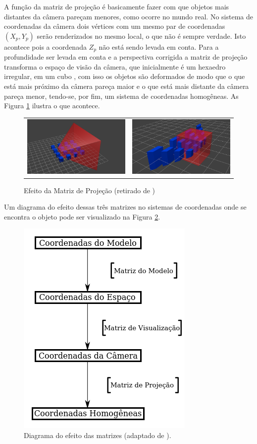 {A função da matriz de projeção é basicamente fazer com que objetos mais distantes da câmera pareçam menores, como ocorre no mundo real. No sistema de coordenadas da câmera dois vértices com um mesmo par de coordenadas $(X_p,Y_p)$ serão renderizados no mesmo local, o que não é sempre verdade. Isto acontece pois a coordenada $Z_p$ não está sendo levada em conta. Para a profundidade ser levada em conta e a perspectiva corrigida a matriz de projeção transforma o espaço de visão da câmera, que inicialmente é um hexaedro irregular, em um cubo \cite{openGlTutorial}, com isso os objetos são deformados de modo que o que está mais próximo da câmera pareça maior e o que está mais distante da câmera pareça menor, tendo-se, por fim, um sistema de coordenadas homogêneas. As Figura \ref{fig:mat_proj} ilustra o que acontece.

\begin{figure}[!htb]
   \centering
\begin{tabular}{cc}
\includegraphics[width=0.4\linewidth]{./figs/TG_projection_matrix_1.png}&
\includegraphics[width=0.4\linewidth]{./figs/TG_projection_matrix_2.png}
\end{tabular}
    \caption{Efeito da Matriz de Projeção (retirado de \cite{openGlTutorial})}
    \label{fig:mat_proj}
\end{figure}

Um diagrama do efeito dessas três matrizes no sistemas de coordenadas onde se encontra o objeto pode ser visualizado na Figura \ref{fig:mat_diagrama}.

\begin{figure}[h!]
\centering
\includegraphics[width=.45\linewidth]{figs/TG_matrices_diagram_pt.png}
\caption{Diagrama do efeito das matrizes (adaptado de \cite{openGlTutorial}).}
\label{fig:mat_diagrama}
\end{figure}

}
